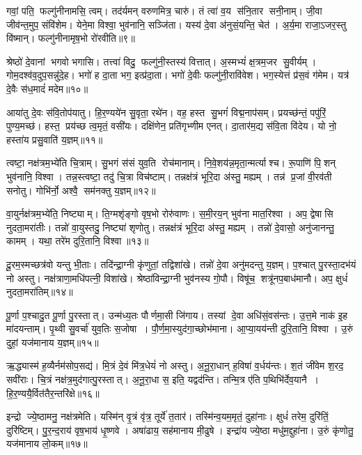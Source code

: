 गवां॒ पति॒ फल्गु॑नीनामसि॒ त्वम्। 
तद॑र्यमन् वरुणमित्र॒ चारु॑। 
तं त्वा॑ व॒य स॑नि॒तार सनी॒नाम्। 
जी॒वा जीव॑न्त॒मुप॒ संवि॑शेम। 
येने॒मा विश्वा॒ भुव॑नानि॒ सञ्जि॑ता। 
यस्य॑ दे॒वा अ॑नुसं॒यन्ति॒ चेत॑। 
अ॒र्य॒मा राजा॒ऽजर॒स्तु वि॑ष्मान्। 
फल्गु॑नीनामृष॒भो रो॑रवीति॥९॥ 

श्रेष्ठो॑ दे॒वानां भगवो भगासि। 
तत्त्वा॑ विदु॒ फल्गु॑नी॒स्तस्य॑ वित्तात्। 
अ॒स्मभ्यं॑ क्ष॒त्रम॒जर सु॒वीर्यम्। 
गोम॒दश्व॑व॒दुप॒सन्नु॑दे॒ह। 
भगो॑ ह दा॒ता भग॒ इत्प्र॑दा॒ता। 
भगो॑ दे॒वीः फल्गु॑नी॒रावि॑वेश। 
भग॒स्येत्तं प्र॑स॒वं ग॑मेम। 
यत्र॑ दे॒वैः स॑ध॒मादं॑ मदेम॥१०॥ 

आया॑तु दे॒वः स॑वि॒तोप॑यातु। 
हि॒र॒ण्यये॑न सु॒वृता॒ रथे॑न। 
वह॒\an{} हस्त सु॒भगं॑ विद्म॒नाप॑सम्। 
प्रयच्छ॑न्तं॒ पपु॑रिं॒ पुण्य॒मच्छ॑। 
हस्त॒ प्रय॑च्छ त्व॒मृतं॒ वसी॑यः। 
दक्षि॑णेन॒ प्रति॑गृभ्णीम एनत्। 
दा॒तार॑म॒द्य स॑वि॒ता वि॑देय। 
यो नो॒ हस्ता॑य प्रसु॒वाति॑ य॒ज्ञम्॥११॥ 

त्वष्टा॒ नक्ष॑त्रम॒भ्ये॑ति चि॒त्राम्। 
सु॒भगं स॑सं युव॒ति रोच॑मानाम्। 
नि॒वे॒शय॑न्न॒\-मृता॒न्मर्त्याश्च। 
रू॒पाणि॑ पि॒शन् भुव॑नानि॒ विश्वा। 
तन्न॒स्त्वष्टा॒ तदु॑ चि॒त्रा विच॑ष्टाम्। 
तन्नक्ष॑त्रं भूरि॒दा अ॑स्तु॒ मह्यम्। 
तन्न॑ प्र॒जां वी॒रव॑ती सनोतु। 
गोभि॑र्नो॒ अश्वै॒ सम॑नक्तु य॒ज्ञम्॥१२॥ 

वा॒युर्नक्ष॑त्रम॒भ्ये॑ति॒ निष्ट्याम्। 
ति॒ग्मशृ॑ङ्गो वृष॒भो रोरु॑वाणः। 
स॒मी॒रय॒न् भुव॑ना मात॒रिश्वा। 
अप॒ द्वेषासि नुदता॒मरा॑तीः। 
तन्नो॑ वा॒युस्तदु॒ निष्ट्या॑ शृणोतु। 
तन्नक्ष॑त्रं भूरि॒दा अ॑स्तु॒ मह्यम्। 
तन्नो॑ दे॒वासो॒ अनु॑जानन्तु॒ कामम्। 
यथा॒ तरे॑म दुरि॒तानि॒ विश्वा॥१३॥ 

दू॒रम॒स्मच्छत्र॑वो यन्तु भी॒ताः। 
तदि॑न्द्रा॒ग्नी कृ॑णुतां॒ तद्विशा॑खे। 
तन्नो॑ दे॒वा अनु॑मदन्तु य॒ज्ञम्। 
प॒श्चात् पु॒रस्ता॒दभ॑यं नो अस्तु। 
नक्ष॑त्राणा॒मधि॑पत्नी॒ विशा॑खे। 
श्रेष्ठा॑विन्द्रा॒ग्नी भुव॑नस्य गो॒पौ। 
विषू॑च॒ शत्रू॑नप॒बाध॑मानौ। 
अप॒ क्षुधं॑ नुदता॒मरा॑तिम्॥१४॥ 

पू॒र्णा प॒श्चादु॒त पू॒र्णा पु॒रस्तात्। 
उन्म॑ध्य॒तः पौर्णमा॒सी जि॑गाय। 
तस्यां दे॒वा अधि॑सं॒वस॑न्तः। 
उ॒त्त॒मे नाक॑ इ॒ह मा॑दयन्ताम्। 
पृ॒थ्वी सु॒वर्चा॑ युव॒तिः स॒जोषा। 
पौ॒र्ण॒मा॒स्युद॑गा॒च्छोभ॑माना। 
आ॒प्या॒यय॑न्ती दुरि॒तानि॒ विश्वा। 
उ॒रुं दुहां॒ यज॑मानाय य॒ज्ञम्॥१५॥ 

ऋ॒द्ध्यास्म॑ ह॒व्यैर्नम॑सोप॒सद्य॑। 
मि॒त्रं दे॒वं मि॑त्र॒धेयं॑ नो अस्तु। 
अ॒नू॒रा॒धान् ह॒विषा॑ व॒र्धय॑न्तः। 
श॒तं जी॑वेम श॒रद॒ सवी॑राः। 
चि॒त्रं नक्ष॑त्र॒मुद॑गात्पु॒रस्तात्। 
अ॒नू॒रा॒धा स॒ इति॒ यद्वद॑न्ति। 
तन्मि॒त्र ए॑ति प॒थिभि॑र्देव॒यानै। 
हि॒र॒ण्ययै॒र्वित॑तै\-र॒न्तरि॑क्षे॥१६॥ 

इन्द्रो ज्ये॒ष्ठामनु॒ नक्ष॑त्रमेति। 
यस्मि॑न् वृ॒त्रं वृ॑त्र॒ तूर्ये॑ त॒तार॑। 
तस्मि॑न्व॒यम॒मृतं॒ दुहा॑नाः। 
क्षुधं॑ तरेम॒ दुरि॑तिं॒ दुरि॑ष्टिम्। 
पु॒र॒न्द॒राय॑ वृष॒भाय॑ धृ॒ष्णवे। 
अषा॑ढाय॒ सह॑मानाय मी॒ढुषे। 
इन्द्रा॑य ज्ये॒ष्ठा मधु॑म॒द्दुहा॑ना। 
उ॒रुं कृ॑णोतु॒ यज॑मानाय लो॒कम्॥१७॥ 

